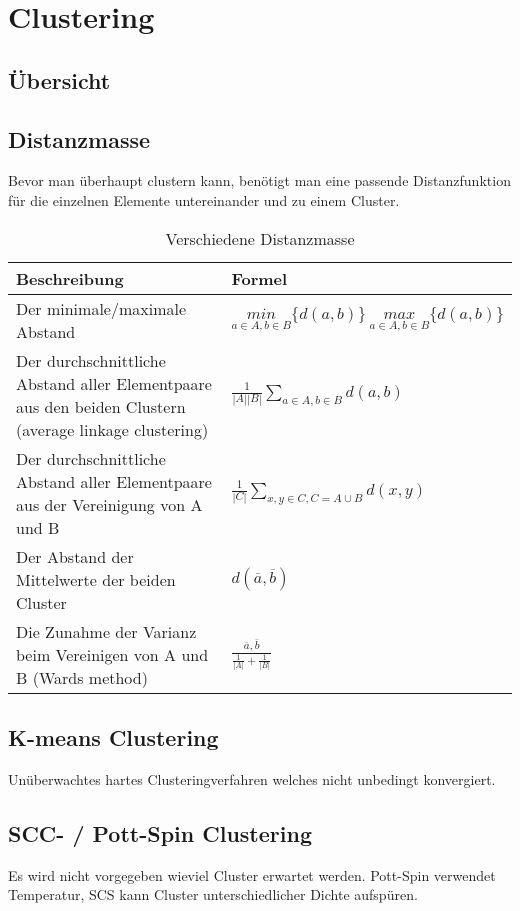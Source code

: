 \section{Clustering}
\subsection{Übersicht}

\subsection{Distanzmasse}
Bevor man überhaupt clustern kann, benötigt man eine passende Distanzfunktion für die einzelnen Elemente untereinander und zu einem Cluster.
\begin{table}[htbp]
	\centering
	\begin{tabular}{p{8cm} | p{8cm}}
		Beschreibung & Formel \\
		\hline
		{Der minimale/maximale Abstand} & {
			$\underset{a \in A, b \in B}{min}\{d(a,b)\} ~ \underset{a \in A, b \in B}{max}\{d(a,b)\}$
		}
		\\
		{Der durchschnittliche Abstand aller Elementpaare aus den beiden Clustern (average linkage clustering)} & {
			$\frac{1}{|A||B|} \sum\limits_{a \in A, b \in B}{d(a,b)}$
		}
		\\
		{Der durchschnittliche Abstand aller Elementpaare aus der Vereinigung von A und B} & {
			$\frac{1}{|C|} \sum\limits_{x,y \in C, C=A \cup B}{d(x,y)}$
		}
		\\
		{Der Abstand der Mittelwerte der beiden Cluster} & {
			$d(\overline a, \overline b)$
		}
		\\
		{Die Zunahme der Varianz beim Vereinigen von A und B (Wards method)} & {
			$\frac{\overline a, \overline b}{\frac{1}{|A|} + \frac{1}{|B|}}$
		}
	\end{tabular}
	\caption{Verschiedene Distanzmasse}
	\label{tab:distanzmasse}
\end{table}
\subsection{K-means Clustering}
Unüberwachtes hartes Clusteringverfahren welches nicht unbedingt konvergiert.
\subsection{SCC- / Pott-Spin Clustering}
Es wird nicht vorgegeben wieviel Cluster erwartet werden. Pott-Spin verwendet Temperatur, SCS kann Cluster unterschiedlicher Dichte aufspüren.

